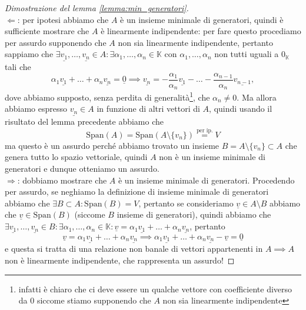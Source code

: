 \begin{proof}[Dimostrazione del lemma \ref{lemma:min_generatori}] \hspace{1cm} \\
    $\boxed{\Leftarrow}$: per ipotesi abbiamo che $A$ è un insieme minimale di generatori, quindi è sufficiente mostrare che $A$ è linearmente indipendente: per fare questo procediamo per assurdo supponendo che $A$ non sia linearmente indipendente, pertanto sappiamo che $\exists \underline{v_1}, \ldots, \underline{v_n} \in A : \exists \alpha_1, \ldots, \alpha_n \in \mathbb{K}$ con $\alpha_1, \ldots, \alpha_n$ non tutti uguali a $0_\mathbb{K}$ tali che
    $$
        \alpha_1 \underline{v_1} + \ldots + \alpha_n \underline{v_n} = \underline{0} \implies \underline{v_n} = - \frac{\alpha_1}{\alpha_n} \underline{v_1} - \ldots - \frac{\alpha_{n-1}}{\alpha_n} \underline{v_{n-1}},
    $$
    dove abbiamo supposto, senza perdita di generalità\footnote{infatti è chiaro che ci deve essere un qualche vettore con coefficiente diverso da $0$ siccome stiamo supponendo che $A$ non sia linearmente indipendente}, che $\alpha_n \neq 0$. Ma allora abbiamo espresso $\underline{v_n} \in A$ in funzione di altri vettori di $A$, quindi usando il risultato del lemma precedente abbiamo che
    $$
        \text{Span}(A) = \text{Span}(A \setminus \{ v_n \}) \stackrel{\text{per ip.}}{=} V
    $$
    ma questo è un assurdo perché abbiamo trovato un insieme $B = A \setminus \{ v_n \} \subset A$ che genera tutto lo spazio vettoriale, quindi $A$ non è un insieme minimale di generatori e dunque otteniamo un assurdo. \\
    $\boxed{\Rightarrow}$: dobbiamo mostrare che $A$ è un insieme minimale di generatori. Procedendo per assurdo, se neghiamo la definizione di insieme minimale di generatori abbiamo che $\exists B \subset A : \text{Span}(B) = V$, pertanto se consideriamo $\underline{v} \in A \setminus B$ abbiamo che $\underline{v} \in \text{Span}(B)$ (siccome $B$ insieme di generatori), quindi abbiamo che $\exists \underline{v_1}, \ldots, \underline{v_n} \in B : \exists \alpha_1, \ldots, \alpha_n \in \mathbb{K} : \underline{v} = \alpha_1 \underline{v_1} + \ldots + \alpha_n \underline{v_n}$, pertanto
    $$
        \underline{v} = \alpha_1 \underline{v_1} + \ldots + \alpha_n \underline{v_n} \implies \alpha_1 \underline{v_1} + \ldots + \alpha_n \underline{v_n} - \underline{v} = \underline{0}
    $$
    e questa si tratta di una relazione non banale di vettori appartenenti in $A \implies A$ non è linearmente indipendente, che rappresenta un assurdo!
\end{proof}
